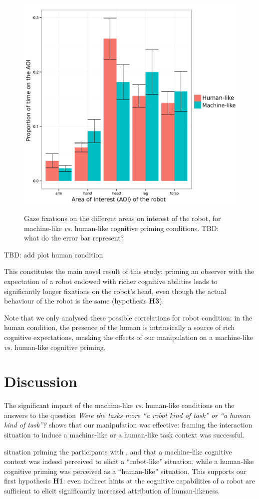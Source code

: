 \documentclass[lettersize, noapacite, twoside, HRI]{apa_HRI}
\newcommand{\vs}{\textit{vs.}\xspace}
\newcommand{\h}[1]{\textbf{H#1}\xspace}
\begin{document}
\begin{figure}[ht!]
    \centering
    \includegraphics[width=0.6\columnwidth]{GazeHighLow}\label{GazeHighLow}
    \caption{Gaze fixations on the different areas on interest of the robot, for machine-like \vs
    human-like cognitive priming conditions. TBD: what do the error bar represent?}
    \label{h3}
\end{figure}

TBD: add plot human condition

This constitutes the main novel result of this study: priming an observer with
the expectation of a robot endowed with richer cognitive abilities leads to significantly longer
fixations on the robot's head, even though the actual behaviour of the robot is
the same (hypothesis \h{3}).

Note that we only analysed these possible correlations for robot condition: in
the human condition, the presence of the human is intrinsically a source of rich
cognitive expectations, masking the effects of our manipulation on a
machine-like \vs human-like cognitive priming.



\section{Discussion}

The significant impact of the machine-like \vs human-like conditions on the
answers to the question \emph{Were the tasks more ``a robot kind of task'' or
``a human kind of task''?} shows that our manipulation was effective: framing
the interaction situation to induce a machine-like or a human-like task context
was successful.

situation priming the participants with , and that a machine-like cognitive
context was indeed perceived to elicit a ``robot-like'' situation, while a
human-like
cognitive priming was perceived as a ``human-like'' situation. This supports our
first hypothesis \h{1}: even indirect hints at the cognitive capabilities of a robot are
sufficient to elicit significantly increased attribution of human-likeness.
\end{document}
